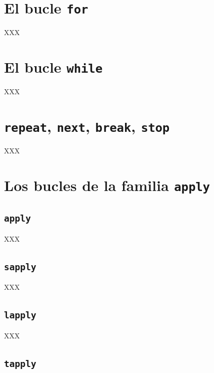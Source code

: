 \documentclass[]{book}
\begin{document}
\section{\texorpdfstring{El bucle
\texttt{for}}{El bucle for}}\label{el-bucle-for}

XXX

\section{\texorpdfstring{El bucle
\texttt{while}}{El bucle while}}\label{el-bucle-while}

XXX

\section{\texorpdfstring{\texttt{repeat}, \texttt{next}, \texttt{break},
\texttt{stop}}{repeat, next, break, stop}}\label{repeat-next-break-stop}

XXX

\section{\texorpdfstring{Los bucles de la familia
\texttt{apply}}{Los bucles de la familia apply}}\label{los-bucles-de-la-familia-apply}

\subsection{\texorpdfstring{\texttt{apply}}{apply}}\label{apply}

XXX

\subsection{\texorpdfstring{\texttt{sapply}}{sapply}}\label{sapply}

XXX

\subsection{\texorpdfstring{\texttt{lapply}}{lapply}}\label{lapply}

XXX

\subsection{\texorpdfstring{\texttt{tapply}}{tapply}}\label{tapply}
\end{document}
